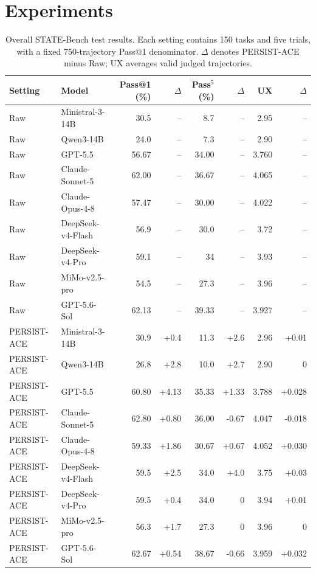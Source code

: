 \section{Experiments}
\label{sec:experiments}

\begin{table}[!t]
\centering
\small
\setlength{\tabcolsep}{3pt}
\renewcommand{\arraystretch}{0.95}
\begin{tabular*}{\textwidth}{@{\extracolsep{\fill}}llrrrrrr@{}}
\toprule
Setting & Model & Pass@1 (\%) & $\Delta$ & Pass$^5$ (\%) & $\Delta$ & UX & $\Delta$ \\
\midrule
Raw & Ministral-3-14B & 30.5 & -- & 8.7 & -- & 2.95 & -- \\
Raw & Qwen3-14B & 24.0 & -- & 7.3 & -- & 2.90 & -- \\
Raw & GPT-5.5 & 56.67 & -- & 34.00 & -- & 3.760 & -- \\
Raw & Claude-Sonnet-5 & 62.00 & -- & 36.67 & -- & 4.065 & -- \\
Raw & Claude-Opus-4-8 & 57.47 & -- & 30.00 & -- & 4.022 & -- \\
Raw & DeepSeek-v4-Flash & 56.9 & -- & 30.0 & -- & 3.72 & -- \\
Raw & DeepSeek-v4-Pro & 59.1 & -- & 34 & -- & 3.93 & -- \\
Raw & MiMo-v2.5-pro & 54.5 & -- & 27.3 & -- & 3.96 & -- \\
Raw & GPT-5.6-Sol & 62.13 & -- & 39.33 & -- & 3.927 & -- \\
PERSIST-ACE & Ministral-3-14B & 30.9 & +0.4 & 11.3 & +2.6 & 2.96 & +0.01 \\
PERSIST-ACE & Qwen3-14B & 26.8 & +2.8 & 10.0 & +2.7 & 2.90 & 0 \\
PERSIST-ACE & GPT-5.5 & 60.80 & +4.13 & 35.33 & +1.33 & 3.788 & +0.028 \\
PERSIST-ACE & Claude-Sonnet-5 & 62.80 & +0.80 & 36.00 & -0.67 & 4.047 & -0.018 \\
PERSIST-ACE & Claude-Opus-4-8 & 59.33 & +1.86 & 30.67 & +0.67 & 4.052 & +0.030 \\
PERSIST-ACE & DeepSeek-v4-Flash & 59.5 & +2.5 & 34.0 & +4.0 & 3.75 & +0.03 \\
PERSIST-ACE & DeepSeek-v4-Pro & 59.5 & +0.4 & 34.0 & 0 & 3.94 & +0.01 \\
PERSIST-ACE & MiMo-v2.5-pro & 56.3 & +1.7 & 27.3 & 0 & 3.96 & 0 \\
PERSIST-ACE & GPT-5.6-Sol & 62.67 & +0.54 & 38.67 & -0.66 & 3.959 & +0.032 \\
\bottomrule
\end{tabular*}
\renewcommand{\arraystretch}{1.0}
\caption{Overall STATE-Bench test results. Each setting contains 150 tasks and
five trials, with a fixed 750-trajectory Pass@1 denominator. $\Delta$ denotes
PERSIST-ACE minus Raw; UX averages valid judged trajectories.}
\label{tab:state-main}
\end{table}

